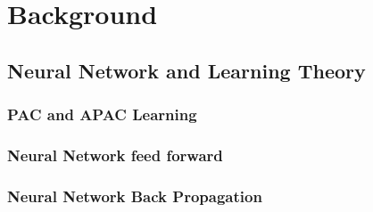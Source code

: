 \chapter{Background} %
\section{Neural Network and Learning Theory}
\subsection{PAC and APAC Learning}
\subsection{Neural Network feed forward}
\subsection{Neural Network Back Propagation}


